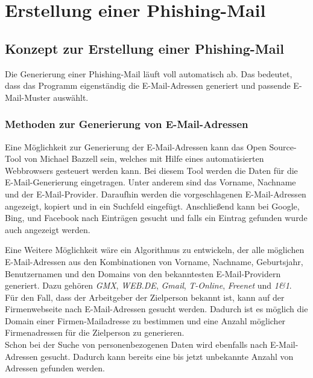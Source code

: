 
\chapter{Erstellung einer Phishing-Mail}  %
\label{cha:ErstellungeinerPhishing-Mail} %


\section{Konzept zur Erstellung einer Phishing-Mail}
Die Generierung einer Phishing-Mail läuft voll automatisch ab. Das bedeutet, dass das Programm eigenständig die E-Mail-Adressen generiert und passende E-Mail-Muster auswählt.

	\subsection{Methoden zur Generierung von E-Mail-Adressen}
	Eine Möglichkeit zur Generierung der E-Mail-Adressen kann das Open Source-Tool von Michael Bazzell \cite{EmailAssumptions} sein, welches mit Hilfe eines automatisierten Webbrowsers gesteuert werden kann. Bei diesem Tool werden die Daten für die E-Mail-Generierung eingetragen. Unter anderem sind das Vorname, Nachname und der E-Mail-Provider. Daraufhin werden die vorgeschlagenen E-Mail-Adressen angezeigt, kopiert und in ein Suchfeld eingefügt. Anschließend kann bei Google, Bing, und Facebook nach Einträgen gesucht und falls ein Eintrag gefunden wurde auch angezeigt werden.
	
	Eine Weitere Möglichkeit wäre ein Algorithmus zu entwickeln, der alle möglichen E-Mail-Adressen aus den Kombinationen von Vorname, Nachname, Geburtsjahr, Benutzernamen und den Domains von den bekanntesten E-Mail-Providern generiert. Dazu gehören \textit{GMX}, \textit{WEB.DE}, \textit{Gmail}, \textit{T-Online}, \textit{Freenet} und \textit{1\&1}.\cite{AnbieterMail} \\
	Für den Fall, dass der Arbeitgeber der Zielperson bekannt ist, kann auf der Firmenwebseite nach E-Mail-Adressen gesucht werden. Dadurch ist es möglich die Domain einer Firmen-Mailadresse zu bestimmen und eine Anzahl  möglicher Firmenadressen für die Zielperson zu generieren.\\
	Schon bei der Suche von personenbezogenen Daten wird ebenfalls nach E-Mail-Adressen gesucht. Dadurch kann bereits eine bis jetzt unbekannte Anzahl von Adressen gefunden werden.
	
